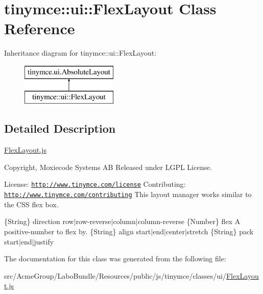 \hypertarget{classtinymce_1_1ui_1_1_flex_layout}{\section{tinymce\+:\+:ui\+:\+:Flex\+Layout Class Reference}
\label{classtinymce_1_1ui_1_1_flex_layout}
}
Inheritance diagram for tinymce\+:\+:ui\+:\+:Flex\+Layout\+:\begin{figure}[H]
\begin{center}
\leavevmode
\includegraphics[height=2.000000cm]{classtinymce_1_1ui_1_1_flex_layout}
\end{center}
\end{figure}


\subsection{Detailed Description}
\hyperlink{_flex_layout_8js}{Flex\+Layout.\+js}

Copyright, Moxiecode Systems A\+B Released under L\+G\+P\+L License.

License\+: \href{http://www.tinymce.com/license}{\tt http\+://www.\+tinymce.\+com/license} Contributing\+: \href{http://www.tinymce.com/contributing}{\tt http\+://www.\+tinymce.\+com/contributing} This layout manager works similar to the C\+S\+S flex box.

\{String\} direction row$\vert$row-\/reverse$\vert$column$\vert$column-\/reverse  \{Number\} flex A positive-\/number to flex by.  \{String\} align start$\vert$end$\vert$center$\vert$stretch  \{String\} pack start$\vert$end$\vert$justify 

The documentation for this class was generated from the following file\+:\begin{DoxyCompactItemize}
\item 
src/\+Acme\+Group/\+Labo\+Bundle/\+Resources/public/js/tinymce/classes/ui/\hyperlink{_flex_layout_8js}{Flex\+Layout.\+js}\end{DoxyCompactItemize}

